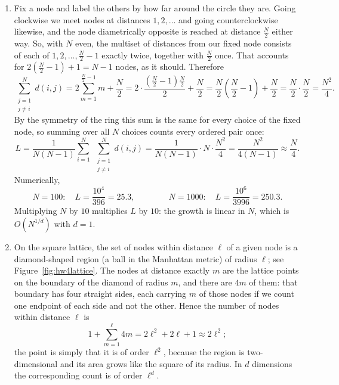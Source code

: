 \documentclass[a4paper,12pt]{article}
\begin{document}
\begin{enumerate}[label=(\alph*)]
\item Fix a node and label the others by how far around the circle they are. Going clockwise we meet nodes at distances $1,2,\ldots$ and going counterclockwise likewise, and the node diametrically opposite is reached at distance $\frac{N}{2}$ either way. So, with $N$ even, the multiset of distances from our fixed node consists of each of $1,2,\ldots,\frac{N}{2}-1$ exactly twice, together with $\frac{N}{2}$ once. That accounts for $2\left( \frac{N}{2}-1 \right)+1 = N-1$ nodes, as it should. Therefore
\[ \sum_{\substack{j=1 \\ j \neq i}}^{N} d(i,j)
= 2\sum_{m=1}^{\frac{N}{2}-1} m + \frac{N}{2}
= 2 \cdot \frac{\left( \frac{N}{2}-1 \right)\frac{N}{2}}{2} + \frac{N}{2}
= \frac{N}{2}\left( \frac{N}{2}-1 \right) + \frac{N}{2}
= \frac{N}{2} \cdot \frac{N}{2}
= \frac{N^2}{4} . \]
By the symmetry of the ring this sum is the same for every choice of the fixed node, so summing over all $N$ choices counts every ordered pair once:
\[ L = \frac{1}{N(N-1)}\sum_{i=1}^{N}\;\sum_{\substack{j=1 \\ j \neq i}}^{N} d(i,j) = \frac{1}{N(N-1)} \cdot N \cdot \frac{N^2}{4} = \frac{N^2}{4(N-1)} \approx \frac{N}{4} . \]
Numerically,
\[ N=100: \quad L = \frac{10^4}{396} = 25.3 ,
\qquad\qquad
N=1000: \quad L = \frac{10^6}{3996} = 250.3 . \]
Multiplying $N$ by $10$ multiplies $L$ by $10$: the growth is linear in $N$, which is $O\!\left( N^{1/d} \right)$ with $d=1$.

\item On the square lattice, the set of nodes within distance $\ell$ of a given node is a diamond-shaped region (a ball in the Manhattan metric) of radius $\ell$; see Figure~\ref{fig:hw4lattice}. The nodes at distance exactly $m$ are the lattice points on the boundary of the diamond of radius $m$, and there are $4m$ of them: that boundary has four straight sides, each carrying $m$ of those nodes if we count one endpoint of each side and not the other. Hence the number of nodes within distance $\ell$ is
\[ 1+\sum_{m=1}^{\ell} 4m = 2\ell^2+2\ell+1 \approx 2\ell^2 ; \]
the point is simply that it is of order $\ell^2$, because the region is two-dimensional and its area grows like the square of its radius. In $d$ dimensions the corresponding count is of order $\ell^d$.


\end{enumerate}
\end{document}
